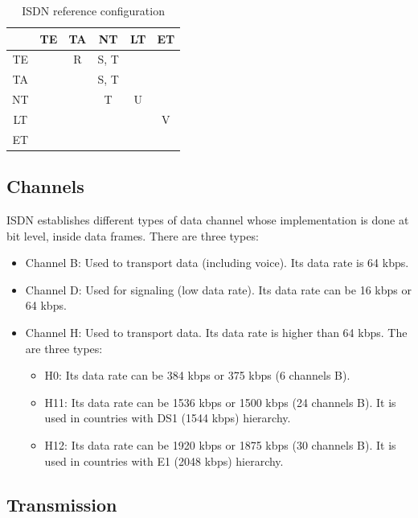 \documentclass[../main.tex]{subfiles}
\begin{document}
\begin{table}[H]
	\centering
	\begin{tabular}{|c|c|c|c|c|c|}
		\hline
		   & TE & TA & NT & LT & ET \\
		\hline
		TE & & R & S, T & & \\
		\hline
		TA & \cellcolor{black} & & S, T & & \\
		\hline
		NT & \cellcolor{black} & \cellcolor{black} & T & U & \\
		\hline
		LT & \cellcolor{black} & \cellcolor{black} & \cellcolor{black} & & V \\
		\hline
		ET & \cellcolor{black} & \cellcolor{black} & \cellcolor{black} & \cellcolor{black} & \\
		\hline
	\end{tabular}
	\caption{
		\label{tab:isdn_ref_conf}
		ISDN reference configuration
	}
\end{table}

\subsection{Channels}

ISDN establishes different types of data channel whose implementation is done at bit level, inside data frames. There are three types:

\begin{itemize}
	\item Channel B: Used to transport data (including voice). Its data rate is 64 kbps.
	\item Channel D: Used for signaling (low data rate). Its data rate can be 16 kbps or 64 kbps.
	\item {
		Channel H: Used to transport data. Its data rate is higher than 64 kbps. The are three types:
		\begin{itemize}
			\item H0: Its data rate can be 384 kbps or 375 kbps (6 channels B).
			\item H11: Its data rate can be 1536 kbps or 1500 kbps (24 channels B). It is used in countries with DS1 (1544 kbps) hierarchy.
			\item H12: Its data rate can be 1920 kbps or 1875 kbps (30 channels B). It is used in countries with E1 (2048 kbps) hierarchy.
		\end{itemize}
	}
\end{itemize}

\subsection{Transmission}
\end{document}
